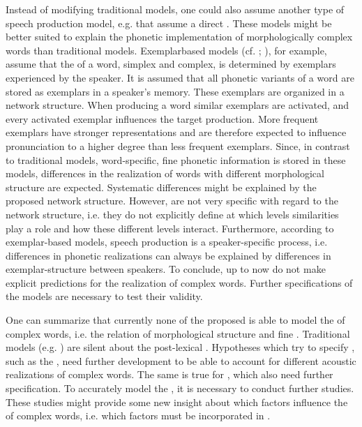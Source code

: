 {{{ 
 Instead of modifying traditional models, one could also assume another type of speech production model, e.g.  that assume a direct . These models might be better suited to explain the phonetic implementation of morphologically complex words than traditional models. Exemplarbased models (cf. \citealt{Johnson.1997b,Pierrehumbert.2001,Pierrehumbert.2002}; \citealt{Bybee.2002}), for example, assume that the  of a word, simplex and complex, is determined by exemplars experienced by the speaker. It is assumed that all phonetic variants of a word are stored as exemplars in a speaker's memory. These exemplars are organized in a network structure. When producing a word similar exemplars are activated, and every activated exemplar influences the target production. More frequent exemplars have stronger representations and are therefore expected to influence pronunciation to a higher degree than less frequent exemplars. 
 Since, in contrast to traditional models, word-specific, fine phonetic  information is stored in these models, differences in the realization of words with different morphological structure are expected. Systematic differences might be explained by the proposed network structure.
 However,  are not very specific with regard to the network structure, i.e. they do not explicitly define at which levels similarities play a role and how these different levels interact. Furthermore, according to exemplar-based models, speech production is a speaker-specific process, i.e. differences in phonetic realizations can always be explained by differences in exemplar-structure between speakers. To conclude, up to now  do not make explicit predictions for the realization of complex words. Further specifications of the models are necessary to test their validity.
 

One can summarize that currently none of the proposed  is able to model the  of complex words, i.e. the relation of morphological structure and fine .  Traditional models (e.g. \citealt{Dell.1986,Levelt.1999b}) are silent about the post-lexical . Hypotheses which try to specify , such as the , need further development to be able to account for different acoustic realizations of complex words. The same is true for , which also need further specification. To accurately model the , it is necessary to conduct further studies. 
These studies might provide some new insight about which factors influence the 
 of complex words, i.e. which factors must be incorporated in .
 
}}}
